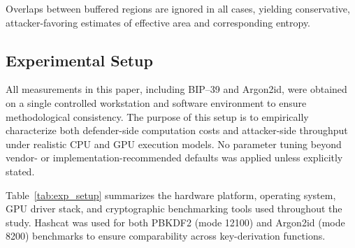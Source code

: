 \documentclass[journal,article,accept,pdftex,moreauthors]{Definitions/mdpi}
\begin{document}
Overlaps between buffered regions are ignored in all cases, yielding conservative, attacker-favoring estimates of effective area and corresponding entropy.


\subsection{Experimental Setup}
\label{sec:experimental_setup}

All measurements in this paper, including BIP--39 and Argon2id, were obtained on a single controlled workstation and software environment to ensure methodological consistency. The purpose of this setup is to empirically characterize both defender-side computation costs and attacker-side throughput under realistic CPU and GPU execution models. No parameter tuning beyond vendor- or implementation-recommended defaults was applied unless explicitly stated.

Table~\ref{tab:exp_setup} summarizes the hardware platform, operating system, GPU driver stack, and cryptographic benchmarking tools used throughout the study. Hashcat was used for both PBKDF2 (mode 12100) and Argon2id (mode 8200) benchmarks to ensure comparability across key-derivation functions.
\end{document}
